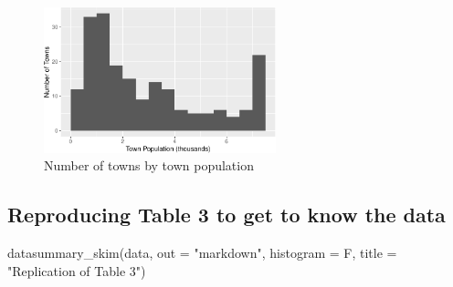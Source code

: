 \documentclass[
  letterpaper,
  DIV=11,
  numbers=noendperiod]{scrartcl}
\newenvironment{Shaded}{\begin{snugshade}}{\end{snugshade}}
\newcommand{\AttributeTok}[1]{\textcolor[rgb]{0.40,0.45,0.13}{#1}}
\newcommand{\FunctionTok}[1]{\textcolor[rgb]{0.28,0.35,0.67}{#1}}
\newcommand{\NormalTok}[1]{\textcolor[rgb]{0.00,0.23,0.31}{#1}}
\newcommand{\StringTok}[1]{\textcolor[rgb]{0.13,0.47,0.30}{#1}}
\begin{document}
\begin{figure}[H]

{\centering \includegraphics[width=0.6\textwidth,height=\textheight]{IO2_PS2_Estrada_files/figure-pdf/figure2-1.pdf}

}

\caption{Number of towns by town population}

\end{figure}%

\subsection{Reproducing Table 3 to get to know the
data}\label{reproducing-table-3-to-get-to-know-the-data}

\begin{Shaded}
\begin{Highlighting}[]
\FunctionTok{datasummary\_skim}\NormalTok{(data, }\AttributeTok{out =} \StringTok{"markdown"}\NormalTok{, }\AttributeTok{histogram =}\NormalTok{ F, }\AttributeTok{title =} \StringTok{"Replication of Table 3"}\NormalTok{)}
\end{Highlighting}
\end{Shaded}
\end{document}
